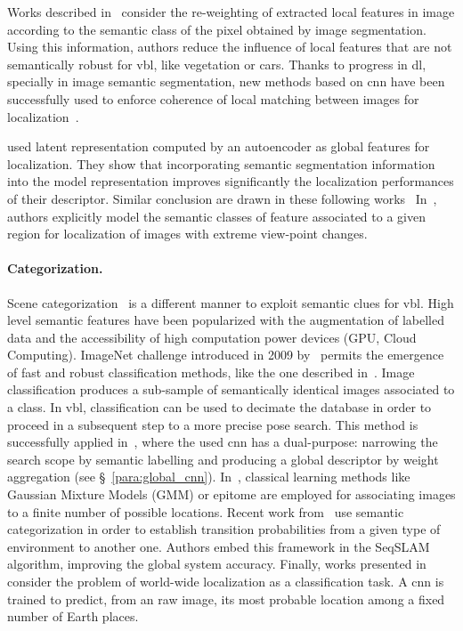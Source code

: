 			 Works described in~\citep{Arandjelovic2014a,Mousavian2015} consider the re-weighting of extracted local features in image according to the semantic class of the pixel obtained by image segmentation. Using this information, authors reduce the influence of local features that are not semantically robust for \ac{vbl}, like vegetation or cars. Thanks to progress in \ac{dl}, specially in image semantic segmentation, new methods based on \ac{cnn} have been successfully used to enforce coherence of local matching between images for localization~\citep{Shi2019,Toft2018}.			 
			 
			 \citet{Schonberger2017a} used latent representation computed by an autoencoder as global features for localization. They show that incorporating semantic segmentation information into the model representation improves significantly the localization performances of their descriptor. Similar conclusion are drawn in these following works~\citep{Seymour2018,Radwan2018} In~\citep{Garg2018,Garg2018a}, authors explicitly model the semantic classes of feature associated to a given region for localization of images with extreme view-point changes.
	    	
		\paragraph{Categorization.}
			Scene categorization~\citep{Wu2009} is a different manner to exploit semantic clues for \ac{vbl}. High level semantic features have been popularized with the augmentation of labelled data and the accessibility of high computation power devices (GPU, Cloud Computing). ImageNet challenge introduced in 2009 by~\citep{Deng2009} permits the emergence of fast and robust classification methods, like the one described in~\citep{Krizhevsky2012}. Image classification produces a sub-sample of semantically identical images associated to a class. In \ac{vbl}, classification can be used to decimate the database in order to proceed in a subsequent step to a more precise pose search. This method is successfully applied in~\citep{Sunderhauf2015}, where the used \ac{cnn} has a dual-purpose: narrowing the search scope by semantic labelling and producing a global descriptor by weight aggregation (see \S~\ref{para:global_cnn}). In~\citep{torralba2003context,Ni2009}, classical learning methods like Gaussian Mixture Models (GMM) or epitome are employed for associating images to a finite number of possible locations. Recent work from~\citep{Garg2017} use semantic categorization in order to establish transition probabilities from a given type of environment to another one. Authors embed this framework in the SeqSLAM algorithm, improving the global system accuracy. Finally, works presented in~\citep{Weyand2016,Seo2018} consider the problem of world-wide localization as a classification task. A \ac{cnn} is trained to predict, from an raw image, its most probable location among a fixed number of Earth places.

